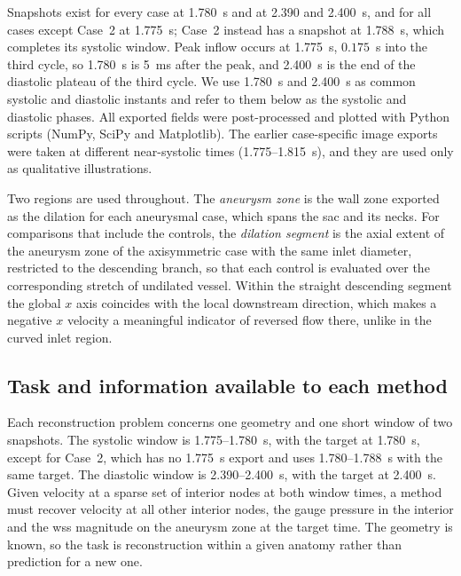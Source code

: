 \documentclass[12pt,a4paper]{article}
\newcommand{\WSS}{\ac{wss}\xspace}
\theoremstyle{definition}
\numberwithin{equation}{section}
\begin{document}
Snapshots exist for every case at 1.780~s and at 2.390 and 2.400~s, and for all cases except Case~2 at 1.775~s; Case~2 instead has a snapshot at 1.788~s, which completes its systolic window. Peak inflow occurs at 1.775~s, $0.175$~s into the third cycle, so 1.780~s is 5~ms after the peak, and 2.400~s is the end of the diastolic plateau of the third cycle. We use 1.780~s and 2.400~s as common systolic and diastolic instants and refer to them below as the systolic and diastolic phases. All exported fields were post-processed and plotted with Python scripts (NumPy, SciPy and Matplotlib). The earlier case-specific image exports were taken at different near-systolic times (1.775--1.815~s), and they are used only as qualitative illustrations.

Two regions are used throughout. The \emph{aneurysm zone} is the wall zone exported as the dilation for each aneurysmal case, which spans the sac and its necks. For comparisons that include the controls, the \emph{dilation segment} is the axial extent of the aneurysm zone of the axisymmetric case with the same inlet diameter, restricted to the descending branch, so that each control is evaluated over the corresponding stretch of undilated vessel. Within the straight descending segment the global $x$ axis coincides with the local downstream direction, which makes a negative $x$ velocity a meaningful indicator of reversed flow there, unlike in the curved inlet region.


\subsection{Task and information available to each method}
\label{sec:task}
Each reconstruction problem concerns one geometry and one short window of two snapshots. The systolic window is 1.775--1.780~s, with the target at 1.780~s, except for Case~2, which has no 1.775~s export and uses 1.780--1.788~s with the same target. The diastolic window is 2.390--2.400~s, with the target at 2.400~s. Given velocity at a sparse set of interior nodes at both window times, a method must recover velocity at all other interior nodes, the gauge pressure in the interior and the \WSS magnitude on the aneurysm zone at the target time. The geometry is known, so the task is reconstruction within a given anatomy rather than prediction for a new one.
\end{document}
